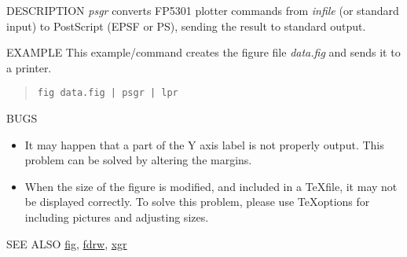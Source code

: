 \begin{synopsis}
 \item[psgr] [ --t {\em title} ] [ --s $S$ ] [ --c $C$ ] [ --x $X$ ]
[ --y $Y$ ] [ --p P ] [ --r $R$ ] [ --b ] 
\item[\ ~~~~~][ --T $T$ ] [ --B $B$ ]
[ --L $L$ ] [ --R $R$ ] [ --P ] [ {\em infile} ]
\end{synopsis}

\begin{qsection}{DESCRIPTION}
{\em psgr} converts FP5301 plotter commands 
from {\em infile} (or standard input) to PostScript (EPSF or PS), 
sending the result to standard output.
\end{qsection}

\begin{options}
\end{options}

\begin{qsection}{EXAMPLE}
This example/command creates the figure file {\em data.fig}
 and sends it to a printer.
\begin{quote}
 \verb!fig data.fig | psgr | lpr!
\end{quote}
\end{qsection}

\begin{qsection}{BUGS}
\begin{itemize}
\item It may happen that a part of the Y axis label
      is not properly output.
      This problem can be solved by altering the margins.
\item When the size of the figure is modified,
      and included in a \TeX file, it may not be displayed correctly.
      To solve this problem, please use \TeX options for including
      pictures and adjusting sizes.
\end{itemize}
\end{qsection}

\begin{qsection}{SEE ALSO}
\hyperlink{fig}{fig},
\hyperlink{fdrw}{fdrw},
\hyperlink{xgr}{xgr}
\end{qsection}
